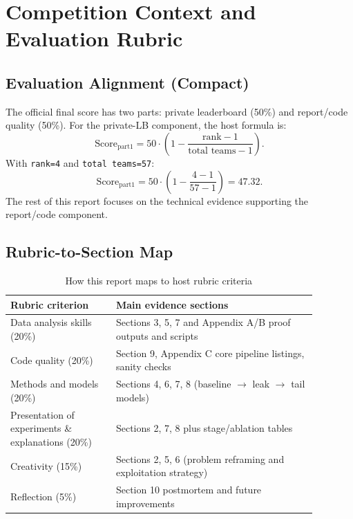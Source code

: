 \section{Competition Context and Evaluation Rubric}

\subsection{Evaluation Alignment (Compact)}
The official final score has two parts: private leaderboard (50\%) and report/code quality (50\%).
For the private-LB component, the host formula is:
\begin{equation}
\text{Score}_{\text{part1}} = 50 \cdot \left(1 - \frac{\text{rank} - 1}{\text{total teams} - 1}\right).
\end{equation}
With \texttt{rank=4} and \texttt{total teams=57}:
\begin{equation}
\text{Score}_{\text{part1}} = 50 \cdot \left(1 - \frac{4 - 1}{57 - 1}\right) = 47.32.
\end{equation}
The rest of this report focuses on the technical evidence supporting the report/code component.

\subsection{Rubric-to-Section Map}
\begin{table}[h]
\centering
\small
\caption{How this report maps to host rubric criteria}
\begin{tabular}{p{0.30\linewidth} p{0.58\linewidth}}
\toprule
Rubric criterion & Main evidence sections \\
\midrule
Data analysis skills (20\%) & Sections 3, 5, 7 and Appendix A/B proof outputs and scripts \\
Code quality (20\%) & Section 9, Appendix C core pipeline listings, sanity checks \\
Methods and models (20\%) & Sections 4, 6, 7, 8 (baseline $\rightarrow$ leak $\rightarrow$ tail models) \\
Presentation of experiments \& explanations (20\%) & Sections 2, 7, 8 plus stage/ablation tables \\
Creativity (15\%) & Sections 2, 5, 6 (problem reframing and exploitation strategy) \\
Reflection (5\%) & Section 10 postmortem and future improvements \\
\bottomrule
\end{tabular}
\end{table}


